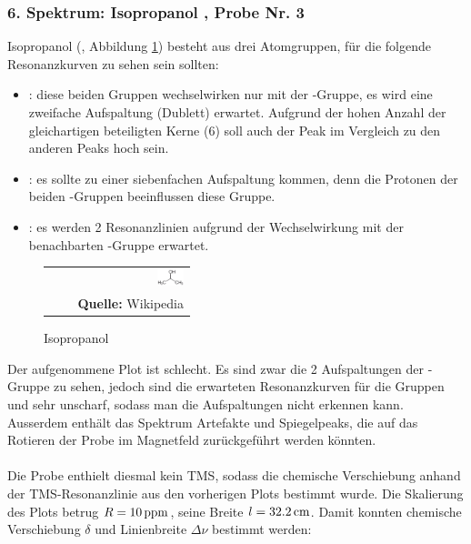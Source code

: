 \documentclass[a4paper,titlepage]{scrartcl}
\numberwithin{equation}{section}
\begin{document}
\subsubsection{6. Spektrum: Isopropanol , Probe Nr. 3}
Isopropanol (, Abbildung \ref{fig:isopropanol}) besteht aus drei Atomgruppen, für die folgende Resonanzkurven zu sehen sein sollten:
\begin{itemize}
\item {}: diese beiden Gruppen wechselwirken nur mit der -Gruppe, es wird eine zweifache Aufspaltung (Dublett) erwartet. Aufgrund der hohen Anzahl der gleichartigen beteiligten Kerne (6) soll auch der Peak im Vergleich zu den anderen Peaks hoch sein.
\item {}: es sollte zu einer siebenfachen Aufspaltung kommen, denn die Protonen der beiden -Gruppen beeinflussen diese Gruppe.
\item {}: es werden 2 Resonanzlinien aufgrund der Wechselwirkung mit der benachbarten -Gruppe erwartet.
\end{itemize}
\begin{figure}[H]
	\centering
	\begin{tabular}{@{}r@{}}
		\includegraphics[width=0.2\textwidth]{isopropanol.png}\\
	\footnotesize\sffamily\textbf{Quelle:} Wikipedia \cite{wiki:isopropanol}
	\end{tabular}
	\caption{Isopropanol }
    \label{fig:isopropanol}
\end{figure}
Der aufgenommene Plot ist schlecht. Es sind zwar die 2 Aufspaltungen der -Gruppe zu sehen, jedoch sind die erwarteten Resonanzkurven für die Gruppen  und  sehr unscharf, sodass man die Aufspaltungen nicht erkennen kann. Ausserdem enthält das Spektrum Artefakte und Spiegelpeaks, die auf das Rotieren der Probe im Magnetfeld zurückgeführt werden könnten.\\ \\
Die Probe enthielt diesmal kein TMS, sodass die chemische Verschiebung anhand der TMS-Resonanzlinie aus den vorherigen Plots bestimmt wurde. Die Skalierung des Plots betrug $R=\unit[10]{ppm}$, seine Breite $l=\unit[32.2]{cm}$. Damit konnten chemische Verschiebung $\delta$ und Linienbreite $\Delta \nu$ bestimmt werden:
\end{document}
